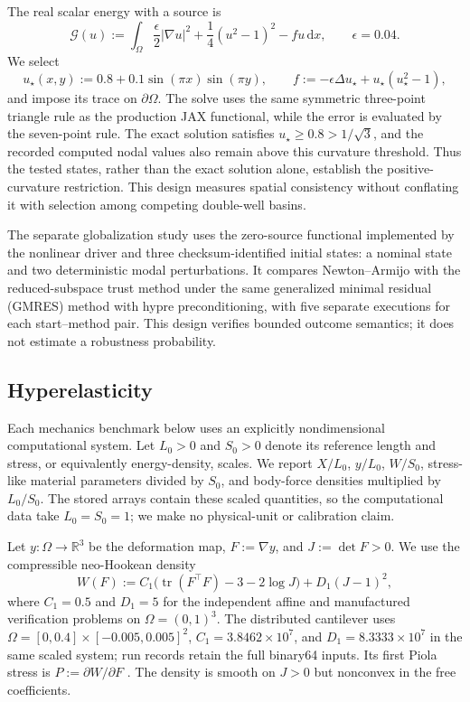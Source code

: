 The real scalar energy with a source is
\begin{equation}
  \mathcal{G}(u)
  :=\int_\Omega
  \frac{\epsilon}{2}\lvert\nabla u\rvert^2
  +\frac14(u^2-1)^2-fu\,\mathrm{d}x,
  \qquad \epsilon=0.04.
  \label{eq:gl-energy}
\end{equation}
We select
\begin{equation}
  u_\star(x,y):=0.8+0.1\sin(\pi x)\sin(\pi y),
  \qquad
  f:=-\epsilon\Delta u_\star+u_\star(u_\star^2-1),
  \label{eq:gl-manufactured}
\end{equation}
and impose its trace on $\partial\Omega$. The solve uses the same symmetric
three-point triangle rule as the production JAX functional, while the error is
evaluated by the seven-point rule. The exact solution satisfies
$u_\star\ge0.8>1/\sqrt{3}$, and the recorded computed nodal values also remain
above this curvature threshold. Thus the tested states, rather than the exact
solution alone, establish the positive-curvature restriction. This design
measures spatial consistency without conflating it with selection among
competing double-well basins.

The separate globalization study uses the zero-source functional implemented
by the nonlinear driver and three checksum-identified initial states: a nominal
state and two deterministic modal perturbations. It compares Newton--Armijo with the
reduced-subspace trust method under the same generalized minimal residual
(GMRES) method with hypre preconditioning, with five separate executions for each
start--method pair. This design verifies bounded outcome semantics; it does not
estimate a robustness probability.

\subsection{Hyperelasticity}
\label{sec:bench-he}

Each mechanics benchmark below uses an explicitly nondimensional computational
system. Let $L_0>0$ and $S_0>0$ denote its reference length and stress, or
equivalently energy-density, scales. We report $X/L_0$, $y/L_0$, $W/S_0$, stress-like
material parameters divided by $S_0$, and body-force densities multiplied by
$L_0/S_0$. The stored arrays contain these scaled quantities, so the
computational data take $L_0=S_0=1$; we make no physical-unit or calibration
claim.

Let $y:\Omega\to\mathbb{R}^3$ be the deformation map,
$F:=\nabla y$, and $J:=\det F>0$. We use the compressible neo-Hookean density
\begin{equation}
  W(F)
  :=C_1\bigl(\operatorname{tr}(F^\top F)-3-2\log J\bigr)
    +D_1(J-1)^2,
  \label{eq:hyperelasticity-energy}
\end{equation}
where $C_1=0.5$ and $D_1=5$ for the independent affine and manufactured
verification problems on $\Omega=(0,1)^3$. The distributed cantilever uses
$\Omega=[0,0.4]\times[-0.005,0.005]^2$, $C_1=3.8462\times10^7$, and
$D_1=8.3333\times10^7$ in the same scaled system; run records retain the full
binary64 inputs. Its first Piola stress is $P:=\partial W/\partial F$
\citep[Chs.~4--6]{bonet2008nonlinear}. The density is smooth on $J>0$ but
nonconvex in the free coefficients.

